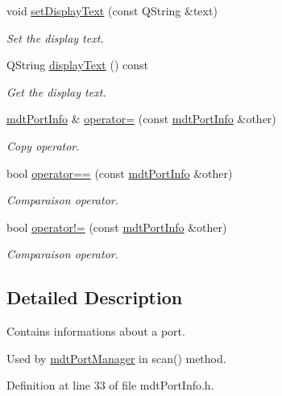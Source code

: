 \begin{DoxyCompactItemize}
void \hyperlink{classmdt_port_info_aad09e261bafcdc72ef6b2479ec37fbe8}{set\-Display\-Text} (const Q\-String \&text)
\begin{DoxyCompactList}\small\item\em Set the display text. \end{DoxyCompactList}\item 
Q\-String \hyperlink{classmdt_port_info_a38bcac67372782228a91d8e7dbf49211}{display\-Text} () const 
\begin{DoxyCompactList}\small\item\em Get the display text. \end{DoxyCompactList}\item 
\hyperlink{classmdt_port_info}{mdt\-Port\-Info} \& \hyperlink{classmdt_port_info_a88bab5da09191b1ecfbb0b11f001ad24}{operator=} (const \hyperlink{classmdt_port_info}{mdt\-Port\-Info} \&other)
\begin{DoxyCompactList}\small\item\em Copy operator. \end{DoxyCompactList}\item 
bool \hyperlink{classmdt_port_info_a72b265f3461d764d0e902c421e3b43e4}{operator==} (const \hyperlink{classmdt_port_info}{mdt\-Port\-Info} \&other)
\begin{DoxyCompactList}\small\item\em Comparaison operator. \end{DoxyCompactList}\item 
bool \hyperlink{classmdt_port_info_a8a198e8693bb328194ac7bba4a29271e}{operator!=} (const \hyperlink{classmdt_port_info}{mdt\-Port\-Info} \&other)
\begin{DoxyCompactList}\small\item\em Comparaison operator. \end{DoxyCompactList}\end{DoxyCompactItemize}


\subsection{Detailed Description}
Contains informations about a port. 

Used by \hyperlink{classmdt_port_manager}{mdt\-Port\-Manager} in scan() method. 

Definition at line 33 of file mdt\-Port\-Info.\-h.



